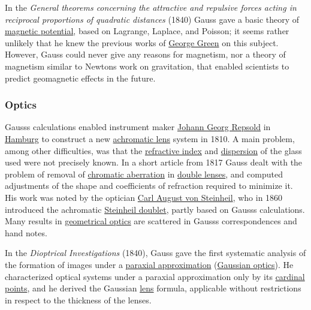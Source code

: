In the \emph{General theorems concerning the attractive and repulsive forces acting in reciprocal proportions of quadratic distances} (1840) Gauss gave a basic theory of \href{https://en.wikipedia.org/wiki/Magnetic_vector_potential}{magnetic potential}, based on Lagrange, Laplace, and Poisson; it seems rather unlikely that he knew the previous works of \href{https://en.wikipedia.org/wiki/George_Green_(mathematician)}{George Green} on this subject. However, Gauss could never give any reasons for magnetism, nor a theory of magnetism similar to Newton\textquotesingle s work on gravitation, that enabled scientists to predict geomagnetic effects in the future.


\subsubsection{Optics}\label{Optics}

Gauss\textquotesingle s calculations enabled instrument maker \href{https://en.wikipedia.org/wiki/Johann_Georg_Repsold}{Johann Georg Repsold} in \href{https://en.wikipedia.org/wiki/Hamburg}{Hamburg} to construct a new \href{https://en.wikipedia.org/wiki/Achromatic_lens}{achromatic lens} system in 1810. A main problem, among other difficulties, was that the \href{https://en.wikipedia.org/wiki/Refractive_index}{refractive index} and \href{https://en.wikipedia.org/wiki/Dispersion_(optics)}{dispersion} of the glass used were not precisely known. In a short article from 1817 Gauss dealt with the problem of removal of \href{https://en.wikipedia.org/wiki/Chromatic_aberration}{chromatic aberration} in \href{https://en.wikipedia.org/wiki/Gauss_lens}{double lenses}, and computed adjustments of the shape and coefficients of refraction required to minimize it. His work was noted by the optician \href{https://en.wikipedia.org/wiki/Carl_August_von_Steinheil}{Carl August von Steinheil}, who in 1860 introduced the achromatic \href{https://en.wikipedia.org/wiki/Achromatic_lens}{Steinheil doublet}, partly based on Gauss\textquotesingle s calculations. Many results in \href{https://en.wikipedia.org/wiki/Geometrical_optics}{geometrical optics} are scattered in Gauss\textquotesingle s correspondences and hand notes.

In the \emph{Dioptrical Investigations} (1840), Gauss gave the first systematic analysis of the formation of images under a \href{https://en.wikipedia.org/wiki/Paraxial_approximation}{paraxial approximation} (\href{https://en.wikipedia.org/wiki/Gaussian_optics}{Gaussian optics}). He characterized optical systems under a paraxial approximation only by its \href{https://en.wikipedia.org/wiki/Cardinal_point_(optics)}{cardinal points}, and he derived the Gaussian \href{https://en.wikipedia.org/wiki/Lens}{lens} formula, applicable without restrictions in respect to the thickness of the lenses.


